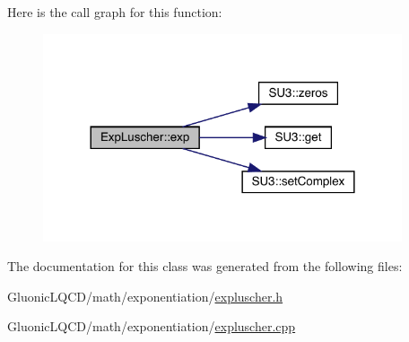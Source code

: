 Here is the call graph for this function\+:
\nopagebreak
\begin{figure}[H]
\begin{center}
\leavevmode
\includegraphics[width=300pt]{class_exp_luscher_a8e4c0689c633728527e1220094c664c1_cgraph}
\end{center}
\end{figure}


The documentation for this class was generated from the following files\+:\begin{DoxyCompactItemize}
\item 
Gluonic\+L\+Q\+C\+D/math/exponentiation/\mbox{\hyperlink{expluscher_8h}{expluscher.\+h}}\item 
Gluonic\+L\+Q\+C\+D/math/exponentiation/\mbox{\hyperlink{expluscher_8cpp}{expluscher.\+cpp}}\end{DoxyCompactItemize}
